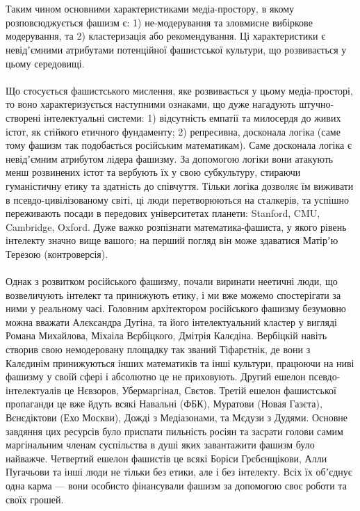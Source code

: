 \\
\\
Таким чином основними характеристиками медіа-простору, в якому розповсюджується фашизм є: 1) не-модерування та зловмисне вибіркове модерування, та 2) кластеризація або рекомендування. Ці характеристики є невідʼємними атрибутами потенційної фашистської культури, що розвивається у цьому середовищі.
\\
\\
Що стосується фашистського мислення, яке розвивається у цьому медіа-просторі, то воно характеризується наступними ознаками, що дуже нагадують штучно-створені інтелектуальні системи: 1) відсутність емпатії та милосердя до живих істот, як стійкого етичного фундаменту; 2) репресивна, досконала логіка (саме тому фашизм так подобається російським математикам). Саме досконала логіка є невідʼємним атрибутом лідера фашизму. За допомогою логіки вони атакують менш розвинених істот та вербують їх у свою субкультуру, стираючи гуманістичну етику та здатність до співчуття. Тільки логіка дозволяє їм виживати в псевдо-цивілізованому світі, ці люди перетворюються на сталкерів, та успішно переживають посади в передових університетах планети: Stanford, CMU, Cambridge, Oxford. Дуже важко розпізнати математика-фашиста, у якого рівень інтелекту значно вище вашого; на перший погляд він може здаватися Матірʼю Терезою (контроверсія).
\\
\\
Однак з розвитком російського фашизму, почали виринати неетичні люди, що возвеличують інтелект та принижують етику, і ми вже можемо спостерігати за ними у реальному часі. Головним архітектором російського фашизму безумовно можна вважати Алєксандра Дугіна, та його інтелектуальний кластер у вигляді Романа Михайлова, Міхаіла Вєрбіцкого, Дмітрія Калєдіна. Вербіцкій навіть створив свою немодеровану площадку так званий Тіфарєтнік, де вони з Калєдинім принижуються інших математиків та інші культури, працюючи на ниві фашизму у своїй сфері і абсолютно це не приховують. Другий ешелон псевдо-інтелектуалів це Нєвзоров, Убермаргінал, Свєтов. Третій ешелон фашистської пропаганди це вже йдуть всякі Навальні (ФБК), Муратови (Новая Газєта), Вєнєдіктови (Ехо Москви), Дожді з Медіазонами, та Мєдузи з Дудями. Основне завдяння цих ресурсів було приспати пильність росіян та засрати голови самим маргінальним членам суспільства в душі яких завантажити фашизм було найважче. Четвертий ешелон фашистів це всякі Боріси Грєбєнщікови, Алли Пугачьови та інші люди не тільки без етики, але і без інтелекту. Всіх їх обʼєднує одна карма — вони особисто фінансували фашизм за допомогою своє роботи та своїх грошей.
